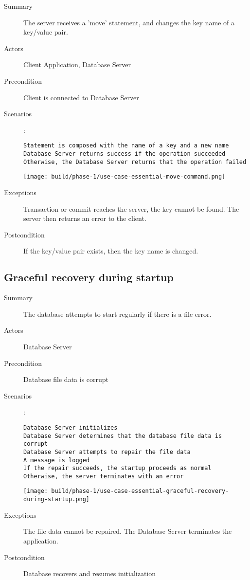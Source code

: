 \documentclass[a4paper]{report}
\begin{document}
	\begin{description}
		\item[Summary] The server receives a 'move' statement, and changes the key name of a key/value pair.
		\item[Actors] Client Application, Database Server
		\item[Precondition] Client is connected to Database Server 
		\item[Scenarios] :

		\begin{lstlisting}
Statement is composed with the name of a key and a new name
Database Server returns success if the operation succeeded
Otherwise, the Database Server returns that the operation failed
		\end{lstlisting}

		\begin{center}
			\texttt{[image: build/phase-1/use-case-essential-move-command.png]}
		\end{center}

		\item[Exceptions] Transaction or commit reaches the server, the key cannot be found.  The server then returns an error to the client.
		\item[Postcondition] If the key/value pair exists, then the key name is changed.
	\end{description}

	\pagebreak

	\subsection{Graceful recovery during startup}

	\begin{description}
		\item[Summary] The database attempts to start regularly if there is a file error.
		\item[Actors] Database Server
		\item[Precondition] Database file data is corrupt
		\item[Scenarios] :

		\begin{lstlisting}
Database Server initializes
Database Server determines that the database file data is corrupt
Database Server attempts to repair the file data
A message is logged
If the repair succeeds, the startup proceeds as normal
Otherwise, the server terminates with an error
		\end{lstlisting}

		\begin{center}
			\texttt{[image: build/phase-1/use-case-essential-graceful-recovery-during-startup.png]}
		\end{center}

		\item[Exceptions] The file data cannot be repaired.  The Database Server terminates the application.
		\item[Postcondition] Database recovers and resumes initialization
	\end{description}
\end{document}
